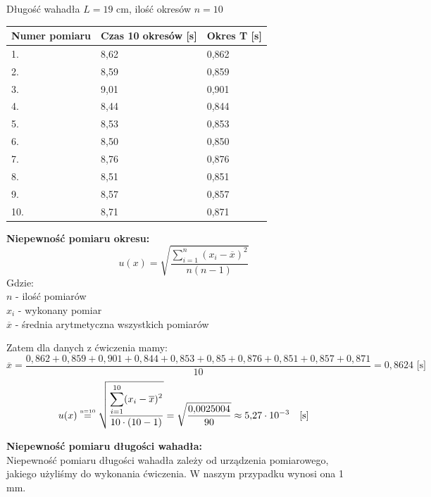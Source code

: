 \documentclass[a4paper,11pt]{article}
\begin{document}
Długość wahadła $L = 19$ cm, ilość okresów $n=10$

\begin{table}[h]
\centering
\begin{tabular}{|l|l|l|}
\hline
Numer pomiaru & Czas 10 okresów {[}s{]} & Okres T {[}s{]} \\ \hline
1.            & 8,62                    & 0,862                 \\ \hline
2.            & 8,59                    & 0,859                 \\ \hline
3.            & 9,01                    & 0,901                 \\ \hline
4.            & 8,44                    & 0,844                 \\ \hline
5.            & 8,53                    & 0,853                 \\ \hline
6.            & 8,50                    & 0,850                 \\ \hline
7.            & 8,76                    & 0,876                 \\ \hline
8.            & 8,51                    & 0,851                 \\ \hline
9.            & 8,57                    & 0,857                 \\ \hline
10.           & 8,71                    & 0,871                 \\ \hline
\end{tabular}
\end{table}

\noindent \textbf{Niepewność pomiaru okresu:} $$ u(x) = \sqrt{\frac{\displaystyle\sum_{i=1}^{n} (x_i - \overline{x})^2}{n(n-1)}}$$
Gdzie: \\
$n$ - ilość pomiarów \\
$x_i$ - wykonany pomiar \\
$\overline{x}$ - średnia arytmetyczna wszystkich pomiarów

\noindent Zatem dla danych z ćwiczenia mamy:
$$\overline{x} = \frac{0{,}862 +0{,}859 +0{,}901+0{,}844+0{,}853+0{,}85+0{,}876+0{,}851+0{,}857+0{,}871}{10} =0{,}8624 \textrm{ [s]} $$ 
$$ u(x) \stackrel{\textrm{\tiny n=10}}{=} \sqrt{\frac{\displaystyle\sum_{i=1}^{10} (x_i - \overline{x})^2}{10\cdot(10-1)}} = 
\sqrt{\frac{0{,}0025004}{90}}
\approx 5{,}27\cdot 10^{-3}\quad\textrm{[s]}$$

\noindent \textbf{Niepewność pomiaru długości wahadła:}\\
Niepewność pomiaru długości wahadła zależy od urządzenia pomiarowego, jakiego użyliśmy do wykonania ćwiczenia. W naszym przypadku wynosi ona 1 mm.
\end{document}
